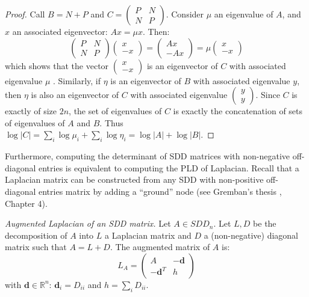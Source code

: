 \begin{proof} Call $B=N+P$ and $C=\left(\begin{array}{cc}
P & N\\
N & P
\end{array}\right)$. Consider $\mu$ an eigenvalue of $A$, and $x$ an associated eigenvector:
$Ax=\mu x$. Then:
\[
\left(\begin{array}{cc}
P & N\\
N & P
\end{array}\right)\left(\begin{array}{c}
x\\
-x
\end{array}\right)=\left(\begin{array}{c}
Ax\\
-Ax
\end{array}\right)=\mu\left(\begin{array}{c}
x\\
-x
\end{array}\right)
\]
which shows that the vector $\left(\begin{array}{c}
x\\
-x
\end{array}\right)$ is an eigenvector of $C$ with associated eigenvalue $\mu$ . Similarly,
if $\eta$ is an eigenvector of $B$ with associated eigenvalue $y$,
then $\eta$ is also an eigenvector of $C$ with associated eigenvalue
$\left(\begin{array}{c}
y\\
y
\end{array}\right)$. Since $C$ is exactly of size $2n$, the set of eigenvalues of $C$
is exactly the concatenation of sets of eigenvalues of $A$ and $B$.
Thus $\log\left|C\right|=\sum_{i}\log\mu_{i}+\sum_{i}\log\eta_{i}=\log\left|A\right|+\log\left|B\right|$.

\end{proof}

Furthermore, computing the determinant of SDD matrices with non-negative
off-diagonal entries is equivalent to computing the PLD of Laplacian.
Recall that a Laplacian matrix can be constructed from any SDD with
non-positive off-diagonal entries matrix by adding a ``ground''
node (see Gremban's thesis \cite{Gremban1996}, Chapter 4).

\begin{definition} \emph{Augmented Laplacian of an SDD matrix.} Let
$A\in SDD_{n}$. Let $L,D$ be the decomposition of $A$ into $L$
a Laplacian matrix and $D$ a (non-negative) diagonal matrix such
that $A=L+D$. The augmented matrix of $A$ is: 
\[
L_{A}=\left(\begin{array}{cc}
A & -\mathbf{d}\\
-\mathbf{d}^{T} & h
\end{array}\right)
\]
with $\mathbf{d}\in\mathbb{R}^{n}$: $\mathbf{d}_{i}=D_{ii}$ and
$h=\sum_{i}D_{ii}$. \end{definition}

